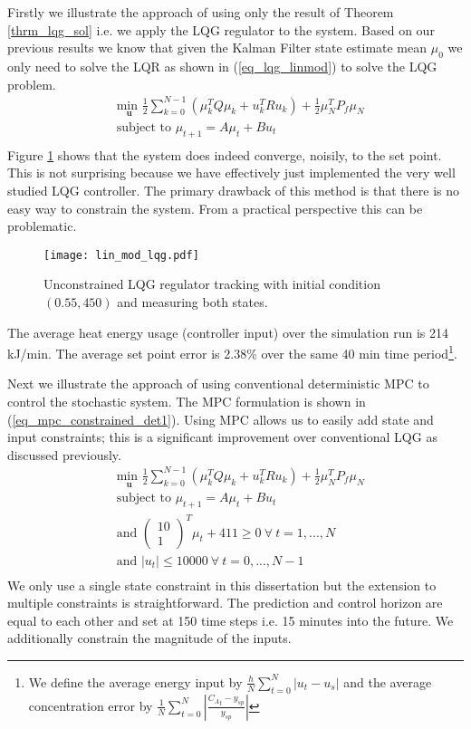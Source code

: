 Firstly we illustrate the approach of using only the result of Theorem \ref{thrm_lqg_sol} i.e. we apply the LQG regulator to the system. Based on our previous results we know that given the Kalman Filter state estimate mean $\mu_0$ we only need to solve the LQR as shown in (\ref{eq_lqg_linmod}) to solve the LQG problem. 
\begin{equation}
\begin{aligned}
&\underset{\mathbf{u}}{\text{min }} \frac{1}{2}\sum_{k=0}^{N-1} \left( \mu_k^TQ\mu_k + u_k^TRu_k \right) + \frac{1}{2}\mu_N^TP_f\mu_N \\
& \text{subject to } \mu_{t+1}=A\mu_t + Bu_t \\
\end{aligned}
\label{eq_lqg_linmod}
\end{equation}
Figure \ref{fig_lin_mod_lqg} shows that the system does indeed converge, noisily, to the set point. This is not surprising because we have effectively just implemented the very well studied LQG controller. The primary drawback of this method is that there is no easy way to constrain the system. From a practical perspective this can be problematic. 
\begin{figure}[H] 
\centering
\texttt{[image: lin\_mod\_lqg.pdf]}
\caption{Unconstrained LQG regulator tracking with initial condition $(0.55, 450)$ and measuring both states.}
\label{fig_lin_mod_lqg}
\end{figure}
The average heat energy usage (controller input) over the simulation run is 214 kJ/min. The average set point error is 2.38\% over the same 40 min time period\footnote{We define the average energy input by $\frac{h}{N}\sum^N_{t=0}|u_t-u_s|$ and the average concentration error by $\frac{1}{N}\sum^N_{t=0}|\frac{{C_A}_t-y_{sp}}{y_{sp}}|$}.
 
Next we illustrate the approach of using conventional deterministic MPC to control the stochastic system. The MPC formulation is shown in (\ref{eq_mpc_constrained_det1}). Using MPC allows us to easily add state and input constraints; this is a significant improvement over conventional LQG as discussed previously.
\begin{equation}
\begin{aligned}
&\underset{\mathbf{u}}{\text{min }} \frac{1}{2}\sum_{k=0}^{N-1} \left( \mu_k^TQ\mu_k + u_k^TRu_k \right) + \frac{1}{2}\mu_N^TP_f\mu_N \\
& \text{subject to } \mu_{t+1}=A\mu_t + Bu_t \\
&\text{and } \begin{pmatrix}
10 \\ 1
\end{pmatrix}^T \mu_t + 411 \geq 0 ~\forall ~t=1,...,N\\
& \text{and } |u_t| \leq 10000 ~\forall ~t=0,...,N-1\\
\end{aligned}
\label{eq_mpc_constrained_det1}
\end{equation}
We only use a single state constraint in this dissertation but the extension to multiple constraints is straightforward. The prediction and control horizon are equal to each other and set at 150 time steps i.e. 15 minutes into the future. We additionally constrain the magnitude of the inputs.

